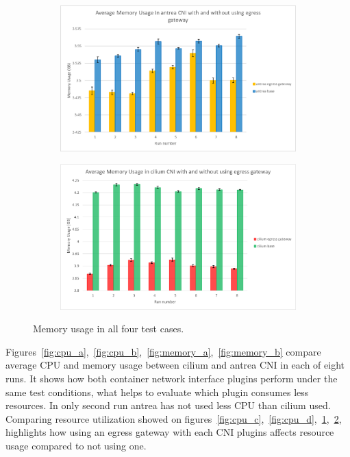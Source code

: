 \begin{figure}[H]
    \begin{subfigure}[b]{0.35\textwidth}
        \includegraphics[width=\textwidth]{plots/small/memory_antrea.png}
        \caption{}
        \label{fig:memory_c}
    \end{subfigure}
    \hfill
    \begin{subfigure}[b]{0.35\textwidth}
        \includegraphics[width=\textwidth]{plots/small/memory_cilium.png}
        \caption{}
        \label{fig:memory_d}
    \end{subfigure}
    
    \caption{Memory usage in all four test cases.}
    \label{fig:memoryFour}
\end{figure}

Figures~\ref{fig:cpu_a},~\ref{fig:cpu_b},~\ref{fig:memory_a},~\ref{fig:memory_b} compare average CPU and memory usage between cilium and antrea CNI in each of eight runs. It shows how both container network interface plugins perform under the same test conditions, what helps to evaluate which plugin consumes less resources. In only second run antrea has not used less CPU than cilium used.
Comparing resource utilization showed on figures~\ref{fig:cpu_c},~\ref{fig:cpu_d},~\ref{fig:memory_c},~\ref{fig:memory_d}, highlights how using an egress gateway with each CNI plugins affects resource usage compared to not using one.

